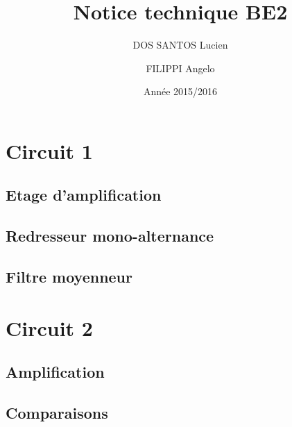 \documentclass{article}
\begin{document}
\title{Notice technique BE2}
\author{DOS SANTOS Lucien \and FILIPPI Angelo}
\date{Année 2015/2016}
\maketitle

\section{Circuit 1}
\subsection{Etage d'amplification}
\subsection{Redresseur mono-alternance}
\subsection{Filtre moyenneur}
\section{Circuit 2}
\subsection{Amplification}
\subsection{Comparaisons}
\end{document}

